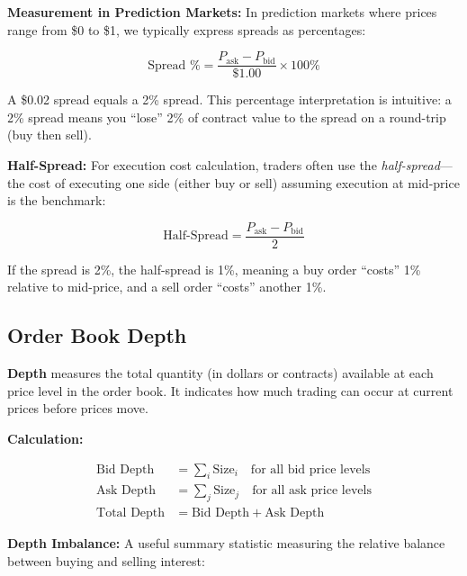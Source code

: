 \textbf{Measurement in Prediction Markets:} In prediction markets where prices range from \$0 to \$1, we typically express spreads as percentages:

\begin{equation}
\text{Spread \%} = \frac{P_{\text{ask}} - P_{\text{bid}}}{\$1.00} \times 100\%
\end{equation}

A \$0.02 spread equals a 2\% spread. This percentage interpretation is intuitive: a 2\% spread means you ``lose'' 2\% of contract value to the spread on a round-trip (buy then sell).

\textbf{Half-Spread:} For execution cost calculation, traders often use the \textit{half-spread}---the cost of executing one side (either buy or sell) assuming execution at mid-price is the benchmark:

\begin{equation}
\text{Half-Spread} = \frac{P_{\text{ask}} - P_{\text{bid}}}{2}
\end{equation}

If the spread is 2\%, the half-spread is 1\%, meaning a buy order ``costs'' 1\% relative to mid-price, and a sell order ``costs'' another 1\%.

\subsection{Order Book Depth}
\label{method:depth-appendix}

\textbf{Depth} measures the total quantity (in dollars or contracts) available at each price level in the order book. It indicates how much trading can occur at current prices before prices move.

\textbf{Calculation:}

\begin{align}
\text{Bid Depth} &= \sum_{i} \text{Size}_i \quad \text{for all bid price levels} \\
\text{Ask Depth} &= \sum_{j} \text{Size}_j \quad \text{for all ask price levels} \\
\text{Total Depth} &= \text{Bid Depth} + \text{Ask Depth}
\end{align}

\textbf{Depth Imbalance:} A useful summary statistic measuring the relative balance between buying and selling interest:

